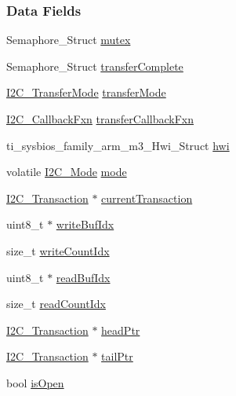 \subsubsection*{Data Fields}
\begin{DoxyCompactItemize}
\item 
Semaphore\-\_\-\-Struct \hyperlink{struct_i2_c_c_c3200___object_ad0d0fa85d96f5284e02d2828a2ededcc}{mutex}
\item 
Semaphore\-\_\-\-Struct \hyperlink{struct_i2_c_c_c3200___object_a4949f4268af84a973c8ad291a323f4d1}{transfer\-Complete}
\item 
\hyperlink{_i2_c_8h_a39f3b9340fc4ee241b0d2da9b2841c26}{I2\-C\-\_\-\-Transfer\-Mode} \hyperlink{struct_i2_c_c_c3200___object_a1859cc58f64d35c9f1e1ea7dc3299d07}{transfer\-Mode}
\item 
\hyperlink{_i2_c_8h_a5ece918abf136397f682df3924441634}{I2\-C\-\_\-\-Callback\-Fxn} \hyperlink{struct_i2_c_c_c3200___object_a7255d478cb8cec42ab567d1dd21366a4}{transfer\-Callback\-Fxn}
\item 
ti\-\_\-sysbios\-\_\-family\-\_\-arm\-\_\-m3\-\_\-\-Hwi\-\_\-\-Struct \hyperlink{struct_i2_c_c_c3200___object_a4aa41291fa2e50f2234a14b4eff0b3fc}{hwi}
\item 
volatile \hyperlink{_i2_c_8h_ac8f0941a68f18f5d1743a21ab32c7929}{I2\-C\-\_\-\-Mode} \hyperlink{struct_i2_c_c_c3200___object_afec78c716583f43bebdc29ea7844e3c1}{mode}
\item 
\hyperlink{struct_i2_c___transaction}{I2\-C\-\_\-\-Transaction} $\ast$ \hyperlink{struct_i2_c_c_c3200___object_af58599ee3172875cd89bb8fc361105a0}{current\-Transaction}
\item 
uint8\-\_\-t $\ast$ \hyperlink{struct_i2_c_c_c3200___object_a1fcf5dd76fa070d4b10aa8c44d708e94}{write\-Buf\-Idx}
\item 
size\-\_\-t \hyperlink{struct_i2_c_c_c3200___object_aef05aaf02f1ff9b559b0baaefda50998}{write\-Count\-Idx}
\item 
uint8\-\_\-t $\ast$ \hyperlink{struct_i2_c_c_c3200___object_a522fae305e0654af93f851f42505eb01}{read\-Buf\-Idx}
\item 
size\-\_\-t \hyperlink{struct_i2_c_c_c3200___object_a9f108cb9fd742f7b4319551fdca5c9d9}{read\-Count\-Idx}
\item 
\hyperlink{struct_i2_c___transaction}{I2\-C\-\_\-\-Transaction} $\ast$ \hyperlink{struct_i2_c_c_c3200___object_a6d9628fb1e8e8e8a56031749fd65b7cb}{head\-Ptr}
\item 
\hyperlink{struct_i2_c___transaction}{I2\-C\-\_\-\-Transaction} $\ast$ \hyperlink{struct_i2_c_c_c3200___object_aacdebea30364cebd4019b2b7b1168033}{tail\-Ptr}
\item 
bool \hyperlink{struct_i2_c_c_c3200___object_a12b1ef0cb50aca717bf99a0a3a79c23f}{is\-Open}
\end{DoxyCompactItemize}


